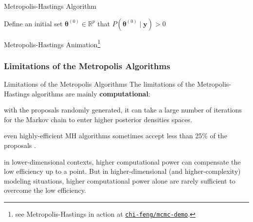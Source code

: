 \begin{frame}{Metropolis-Hastings Algorithm}
	\SetAlCapFnt{\normalsize}
	\SetAlCapNameFnt{\normalsize}
	\small
	\begin{algorithm}[H]
		\DontPrintSemicolon
		\SetAlgoNoEnd
		\SetAlgoLined
		Define an initial set $\boldsymbol{\theta}^{(0)} \in \mathbb{R}^p$ that $P\left(\boldsymbol{\theta}^{(0)} \mid \mathbf{y} \right) > 0$\;
		\caption{Metropolis-Hastings}
	\end{algorithm}
\end{frame}

\begin{frame}{Metropolis-Hastings Animation\footnote{see Metropolis-Hastings in action at \href{https://chi-feng.github.io/mcmc-demo/app.html?algorithm=RandomWalkMH&target=banana}{\texttt{chi-feng/mcmc-demo}}.}}
	\centering
\end{frame}

\subsubsection{Limitations of the Metropolis Algorithms}
\begin{frame}{Limitations of the Metropolis Algorithms}
	The limitations of the Metropolis-Hastings algorithms are mainly \textbf{computational}:
	\begin{vfilleditems}
		\item with the proposals randomly generated,
		it can take a large number of iterations for the
		Markov chain to enter higher posterior densities spaces.
		\item even highly-efficient MH algorithms sometimes accept less than
		25\% of the proposals \parencite{robertsWeakConvergenceOptimal1997, beskosOptimalTuningHybrid2013}.
		\item in lower-dimensional contexts, higher computational power can compensate the low efficiency up to a point.
		But in higher-dimensional (and higher-complexity) modeling situations,
		higher computational power alone are rarely sufficient to overcome the low efficiency.
	\end{vfilleditems}
\end{frame}

